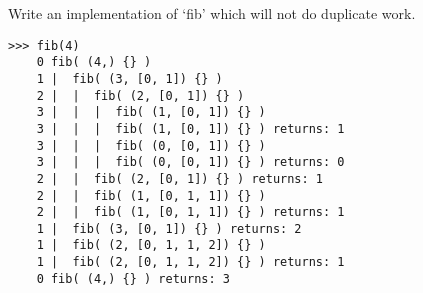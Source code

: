 \documentclass[11pt]{article}
\newenvironment{answer}{\large\lstset{basicstyle=\large}\color{white}}{}
\newenvironment{answer}{\large\lstset{basicstyle=\large}\color{red}}{}
\begin{document}
\begin{enumerate}
      Write an implementation of `fib' which will not do duplicate work.

    \begin{answer}
    
\begin{verbatim}
>>> fib(4)
    0 fib( (4,) {} )
    1 |  fib( (3, [0, 1]) {} )
    2 |  |  fib( (2, [0, 1]) {} )
    3 |  |  |  fib( (1, [0, 1]) {} )
    3 |  |  |  fib( (1, [0, 1]) {} ) returns: 1
    3 |  |  |  fib( (0, [0, 1]) {} )
    3 |  |  |  fib( (0, [0, 1]) {} ) returns: 0
    2 |  |  fib( (2, [0, 1]) {} ) returns: 1
    2 |  |  fib( (1, [0, 1, 1]) {} )
    2 |  |  fib( (1, [0, 1, 1]) {} ) returns: 1
    1 |  fib( (3, [0, 1]) {} ) returns: 2
    1 |  fib( (2, [0, 1, 1, 2]) {} )
    1 |  fib( (2, [0, 1, 1, 2]) {} ) returns: 1
    0 fib( (4,) {} ) returns: 3
\end{verbatim}
    \end{answer}

\end{enumerate}
\end{document}
